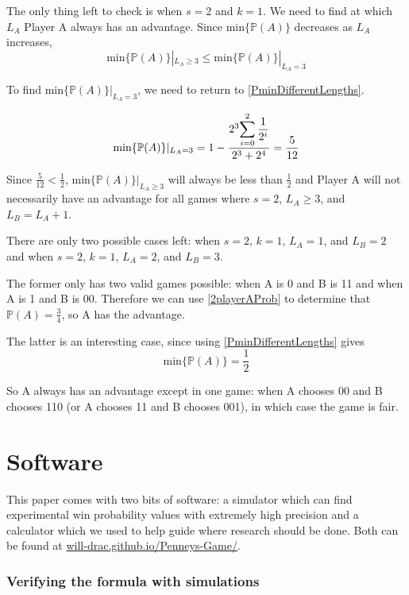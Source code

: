\documentclass[english,12pt,a4paper,final]{article}
\begin{document}
The only thing left to check is when $s=2$ and $k=1$. We need to find at which $L_A$ Player A always has an advantage. Since $\text{min}\{\mathbb{P}(A)\}$ decreases as $L_A$ increases,
\begin{equation*}
	\text{min}\{\mathbb{P}(A)\}|_{L_A \ge 3} \le \text{min}\{\mathbb{P}(A)\}|_{L_A = 3}
\end{equation*}

To find $\text{min}\{\mathbb{P}(A)\}|_{L_A = 3}$, we need to return to \eqref{PminDifferentLengths}. 

\begin{equation*}
	\text{min}\{\mathbb{P}(A)\}|_{L_A = 3} = 1-\frac{2^3 \mathlarger{\sum_{i=0}^{2} \frac{1}{2^i}}}{2^3+2^4} = \frac{5}{12}
\end{equation*}

Since $\frac{5}{12} < \frac{1}{2}$, $\text{min}\{\mathbb{P}(A)\}|_{L_A \ge 3}$ will always be less than $\frac{1}{2}$ and Player A will not necessarily have an advantage for all games where $s=2$, $L_A \ge 3$, and $L_B = L_A + 1$.

There are only two possible cases left: when $s=2$, $k=1$, $L_A=1$, and $L_B=2$ and when $s=2$, $k=1$, $L_A=2$, and $L_B=3$. 

The former only has two valid games possible: when A is 0 and B is 11 and when A is 1 and B is 00. Therefore we can use \eqref{2playerAProb} to determine that $\mathbb{P}(A)=\frac{3}{4}$, so A has the advantage.

The latter is an interesting case, since using \eqref{PminDifferentLengths} gives
\begin{equation*}
	\text{min}\{\mathbb{P}(A)\} = \frac{1}{2}
\end{equation*}

So A always has an advantage except in one game: when A chooses 00 and B chooses 110 (or A chooses 11 and B chooses 001), in which case the game is fair.

\part {Software}

This paper comes with two bits of software: a simulator which can find experimental win probability values with extremely high precision and a calculator which we used to help guide where research should be done. Both can be found at \href{https://will-drac.github.io/Penneys-Game/}{will-drac.github.io/Penneys-Game/}.

\section{Verifying the formula with simulations}
\end{document}

